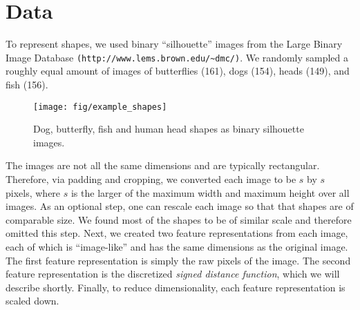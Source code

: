 \documentclass[anon,11pt]{9520} %
\newcommand{\mb}{\mathbf}
\begin{document}
\begin{comment}
\subsection{Class Imbalance}
Often, datasets do not have an equal number of positive and negative
examples. This situation, known as {\em class imbalance} makes the dominant
class more likely to be predicted, as examples from the dominant examples stand
to accumulate greater loss because of their greater number. This is typically
resolved by assigning a weight $\gamma_i$ to each point $\mb x_i$, which in our
case leads to a weighted LapRLS objective
\[ \frac{1}{\ell} \|\mb J \mb \Gamma(\mb K \mb c-\mb y')\|^2 + \lambda_A \mb c^T \mb K \mb c + \frac{1}{n^2} \mb c^T \mb K \mb L \mb K \mb c,\] where $\mb \Gamma$ is a diagonal matrix with weights $\gamma_1,\dots,\gamma_{\ell}$ as its first $\ell$ entries and zeros as its remaining $u$ entries. See \cite{Weiss} (G. Weiss. Mining with rarity: A unifying framework.SIGKDD Explorations, 6(1):7-19) and \cite{Kotsiantis} (Handling imbalanced datasets: A review Sotiris Kotsiantis, Dimitris Kanellopoulos, Panayiotis Pintelas)
2004.
\end{comment}

\section{Data}
To represent shapes, we used binary ``silhouette'' images from the Large Binary
Image Database \texttt{(http://www.lems.brown.edu/\textasciitilde{}dmc/)}. We randomly sampled a roughly
equal amount of images of butterflies (161), dogs (154), heads (149), and fish
(156).
\begin{figure}[h!]
\begin{center}
\texttt{[image: fig/example\_shapes]}
\end{center}
\caption{\label{fig:image_examples} Dog, butterfly, fish and human head shapes
  as binary silhouette images.}
\end{figure}
The images are not all the same dimensions and are typically rectangular. Therefore,
via padding and cropping, we converted each image to be $s$ by $s$ pixels, where
$s$ is the larger of the maximum width and maximum height over all images.  As
an optional step, one can rescale each image so that that shapes are of
comparable size. We found most of the shapes to be of similar scale and
therefore omitted this step. Next, we created two feature representations from
each image, each of which is ``image-like'' and has the same dimensions as the
original image. The first feature representation is simply the raw pixels of the
image. The second feature representation is the discretized {\em signed distance
  function}, which we will describe shortly. Finally, to reduce
dimensionality, each feature representation is scaled down.
\end{document}
